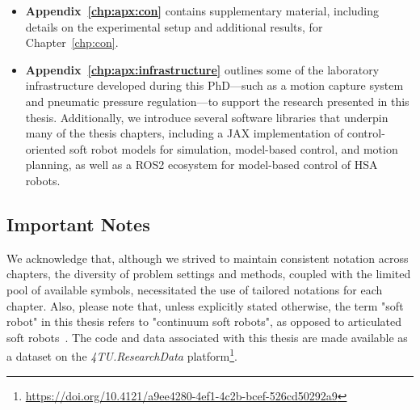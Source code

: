 \begin{itemize}
    \item \textbf{Appendix~\ref{chp:apx:con}} contains supplementary material, including details on the experimental setup and additional results, for Chapter~\ref{chp:con}.
    \item 
    \textbf{Appendix~\ref{chp:apx:infrastructure}} outlines some of the laboratory infrastructure developed during this PhD—such as a motion capture system and pneumatic pressure regulation—to support the research presented in this thesis. Additionally, we introduce several software libraries that underpin many of the thesis chapters, including a JAX implementation of control-oriented soft robot models for simulation, model-based control, and motion planning, as well as a ROS2 ecosystem for model-based control of \gls{HSA} robots.
\end{itemize}
 

\subsection{Important Notes}
We acknowledge that, although we strived to maintain consistent notation across chapters, the diversity of problem settings and methods, coupled with the limited pool of available symbols, necessitated the use of tailored notations for each chapter.
Also, please note that, unless explicitly stated otherwise, the term "soft robot" in this thesis refers to "continuum soft robots", as opposed to articulated soft robots~\citep{della2020softencyclopedia}.
The code and data associated with this thesis are made available as a dataset on the \emph{4TU.ResearchData} platform\footnote{\url{https://doi.org/10.4121/a9ee4280-4ef1-4c2b-bcef-526cd50292a9}}.